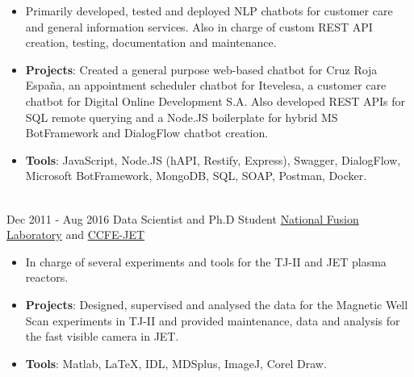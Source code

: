 \documentclass[letterpaper]{twentysecondcv} %
\begin{document}
\begin{twenty}
        {}
        {
        {\begin{itemize}
        \item Primarily developed, tested and deployed NLP chatbots for customer care and general information services. Also in charge of custom REST API creation, testing, documentation and maintenance.
        \item \textbf{Projects}: Created a general purpose web-based chatbot for Cruz Roja Espa\~na, an appointment scheduler chatbot for Itevelesa, a customer care chatbot for Digital Online Development S.A. Also developed REST APIs for SQL remote querying and a Node.JS boilerplate for hybrid MS BotFramework and DialogFlow chatbot creation.
        \item \textbf{Tools}: JavaScript, Node.JS (hAPI, Restify, Express), Swagger, DialogFlow, Microsoft BotFramework, MongoDB, SQL, SOAP, Postman, Docker.
    \end{itemize}}
        }
     \\
     \twentyitem
   		{Dec 2011 -}
		{Aug 2016}
        {Data Scientist and Ph.D Student}
        {\href{http://www.fusion.ciemat.es/home/}{National Fusion Laboratory} and \href{https://www.euro-fusion.org/devices/jet/}{CCFE-JET}}
        {}
        {
        \begin{itemize}
        \item In charge of several experiments and tools for the TJ-II and JET plasma reactors. 
        \item \textbf{Projects}: Designed, supervised and analysed the data for the Magnetic Well Scan experiments in TJ-II and provided maintenance, data and analysis for the fast visible camera in JET.
        \item \textbf{Tools}: Matlab, \LaTeX, IDL, MDSplus, ImageJ, Corel Draw.
    \end{itemize}
    	}
        
\end{twenty}

\end{document}
